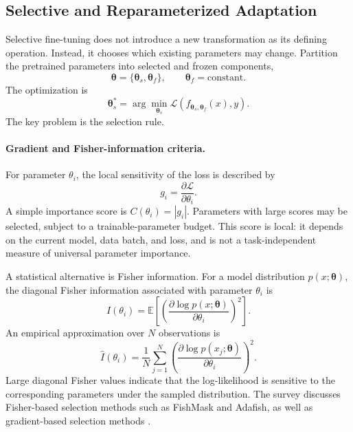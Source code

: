 \subsection{Selective and Reparameterized Adaptation}
\label{subsec:peft-selective-reparameterized}

Selective fine-tuning does not introduce a new transformation as its defining
operation. Instead, it chooses which existing parameters may change. Partition
the pretrained parameters into selected and frozen components,
\begin{equation}
    \boldsymbol{\theta}
    =
    \{\boldsymbol{\theta}_{s},
      \boldsymbol{\theta}_{f}\},
    \qquad
    \boldsymbol{\theta}_{f}=\text{constant}.
    \label{eq:peft-selected-partition}
\end{equation}
The optimization is
\begin{equation}
    \boldsymbol{\theta}_{s}^{*}
    =
    \arg\min_{\boldsymbol{\theta}_{s}}
    \mathcal{L}
    \left(
        f_{\boldsymbol{\theta}_{s},\boldsymbol{\theta}_{f}}(x),y
    \right).
    \label{eq:peft-selective-objective}
\end{equation}
The key problem is the selection rule.

\paragraph{Gradient and Fisher-information criteria.}
For parameter $\theta_i$, the local sensitivity of the loss is described by
\begin{equation}
    g_i
    =
    \frac{\partial\mathcal{L}}{\partial\theta_i}.
    \label{eq:peft-parameter-gradient}
\end{equation}
A simple importance score is $C(\theta_i)=|g_i|$. Parameters with large
scores may be selected, subject to a trainable-parameter budget. This score
is local: it depends on the current model, data batch, and loss, and is not a
task-independent measure of universal parameter importance.

A statistical alternative is Fisher information. For a model distribution
$p(x;\boldsymbol{\theta})$, the diagonal Fisher information associated with
parameter $\theta_i$ is
\begin{equation}
    I(\theta_i)
    =
    \mathbb{E}
    \left[
        \left(
            \frac{\partial\log p(x;\boldsymbol{\theta})}
                 {\partial\theta_i}
        \right)^2
    \right].
    \label{eq:peft-fisher}
\end{equation}
An empirical approximation over $N$ observations is
\begin{equation}
    \widehat{I}(\theta_i)
    =
    \frac{1}{N}\sum_{j=1}^{N}
    \left(
        \frac{\partial\log p(x_j;\boldsymbol{\theta})}
             {\partial\theta_i}
    \right)^2.
    \label{eq:peft-empirical-fisher}
\end{equation}
Large diagonal Fisher values indicate that the log-likelihood is sensitive
to the corresponding parameters under the sampled distribution. The survey
discusses Fisher-based selection methods such as FishMask and Adafish, as
well as gradient-based selection methods \parencite{prottasha2025peft}.

